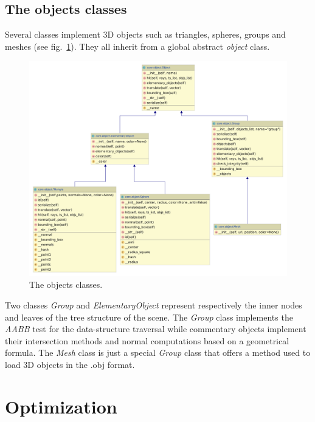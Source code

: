 \documentclass[a4paper,11pt]{article}%
\begin{document}
\subsection*{The objects classes}
Several classes implement 3D objects such as triangles, spheres, groups and meshes (see fig.~\ref{fig:object}). They all inherit from a global abstract \emph{object} class.
\begin{figure}[h]
    \centering
    \includegraphics[scale=0.3]{img/object.pdf}
    \caption{The objects classes.}
    \label{fig:object}
\end{figure}

Two classes \emph{Group} and \emph{ElementaryObject} represent respectively the inner nodes and leaves of the tree structure of the scene.
The \textit{Group} class implements the \textit{AABB} test for the data-structure traversal while commentary objects implement their intersection methods and normal computations based on a geometrical formula.
The \emph{Mesh} class is just a special \textit{Group} class that offers a method used to load 3D objects in the .obj format.


\section{Optimization}
\end{document}
